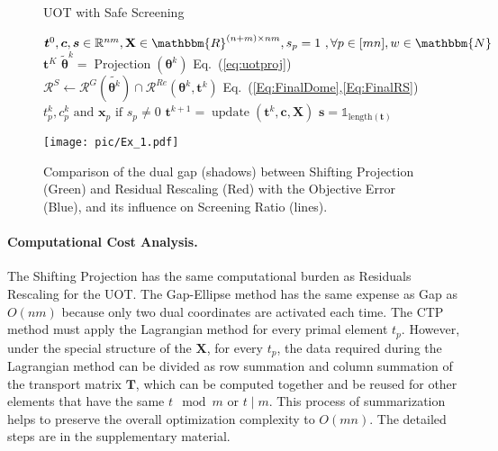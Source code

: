 \documentclass[11pt]{article}
\newcommand{\one}{\mathds{1}}
\newcommand{\mat}[1]{\mathbf{#1}}
\renewcommand{\vec}[1]{\bm{#1}}
\begin{document}
\begin{figure}[t]
\begin{minipage}[t]{0.55\textwidth}
\begin{algorithm}[H]
\caption{UOT with Safe Screening}
\begin{algorithmic}
\label{Alg:UOTDynamicScreening}
\renewcommand{\algorithmicrequire}{\textbf{Input:}}
\renewcommand{\algorithmicensure}{\textbf{Output:}}
\REQUIRE $\vec{t}^0, \vec c, \vec s \in \mathbb{R}^{nm}, \mat X \in{\mathbbm{R}^{(n+m)\times nm}}, s_{p}=1\ ,\forall p \in [mn], w \in \mathbbm{N}$
\ENSURE $\vec t^{K}$
\STATE $\tilde{\vec{\theta}}^{k} = \operatorname{Projection}(\vec{\theta}^k)$ \hfill Eq.~(\ref{eq:uotproj})
\FOR {$p = 0 \text{ to } \text{length}(\vec t)$}
\STATE $\mathcal{R}^{S} \leftarrow \mathcal{R}^{G}(\tilde{\vec \theta^{k}})\cap \mathcal{R}^{Re}{(\vec{\theta}^{k},\vec{t}^k)}$ \hfill Eq.~(\ref{Eq:FinalDome},\ref{Eq:FinalRS})
\STATE
\STATE{$\vec s \leftarrow {s_{p} = 0 \text{ if } {\displaystyle \max_{\vec{\theta} \in \mathcal{R}^S} {\vec x_{p}}^T\vec{\theta}^{k} <\lambda c_{p} }}$ \hfill Eq.~(\ref{eq:kktineq})}
\STATE {}$ t_p^{k}, c_p^{k} \text{ and } \vec x_p \text{ if } s_{p}\neq 0$
\ENDFOR
\ENDIF
\STATE $\vec{t}^{k+1} = \operatorname{update}(\vec{t}^k, \vec c, \mat X)$
\STATE $\vec s = \one_{\text{length}(\vec t)}$
\ENDFOR
\end{algorithmic}
\end{algorithm}
\end{minipage}
\hfill
\begin{minipage}[t]{0.4\textwidth}
\label{Fig:ex2_1}
\centering
\texttt{[image: pic/Ex\_1.pdf]}
\caption{Comparison of the dual gap (shadows) between Shifting Projection (Green) and Residual Rescaling (Red) with the Objective Error (Blue), and its influence on Screening Ratio (lines).}
\label{Fig:ex1}
\end{minipage}
\end{figure}
\paragraph{Computational Cost Analysis.}
The Shifting Projection has the same computational burden as Residuals Rescaling for the UOT. The Gap-Ellipse method has the same expense as Gap as $O(nm)$ because only two dual coordinates are activated each time. The CTP method must apply the Lagrangian method for every primal element $t_p$. However, under the special structure of the $\mat X$, for every $t_p$, the data required during the Lagrangian method can be divided as row summation and column summation of the transport matrix $\mat T$, which can be computed together and be reused for other elements that have the same $t \mod m $ or $t \mid m$. This process of summarization helps to preserve the overall optimization complexity to $O(mn)$. The detailed steps are in the supplementary material.
\end{document}
